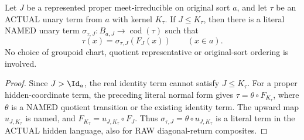 \begin{corollary}
\label{cor:typed-forced-term-factorisation}
Let \(J\) be a represented proper meet-irreducible on original
sort \(a\), and let \(\tau\) be an ACTUAL unary term from \(a\)
with kernel \(K_\tau\).  If \(J\le K_\tau\), then there is a
literal NAMED unary term
\(\sigma_{\tau,J}:B_{a,J}\to\operatorname{cod}(\tau)\) such that
\[
                \tau(x)=\sigma_{\tau,J}(F_J(x))
                \qquad(x\in a).
\]
No choice of groupoid chart, quotient representative or
original-sort ordering is involved.
\end{corollary}
\begin{proof}
Since \(J>\Id_a\), the real identity term cannot satisfy
\(J\le K_\tau\).  For a proper hidden-coordinate term,
the preceding literal normal form gives
\(\tau=\theta\circ F_{K_\tau}\),
where \(\theta\) is a NAMED quotient transition or the
existing identity term.  The upward map
\(u_{J,K_\tau}\) is named, and
\(F_{K_\tau}=u_{J,K_\tau}\circ F_J\).
Thus \(\sigma_{\tau,J}=\theta\circ u_{J,K_\tau}\)
is a literal term in the ACTUAL hidden language,
also for RAW diagonal-return composites.
\end{proof}

